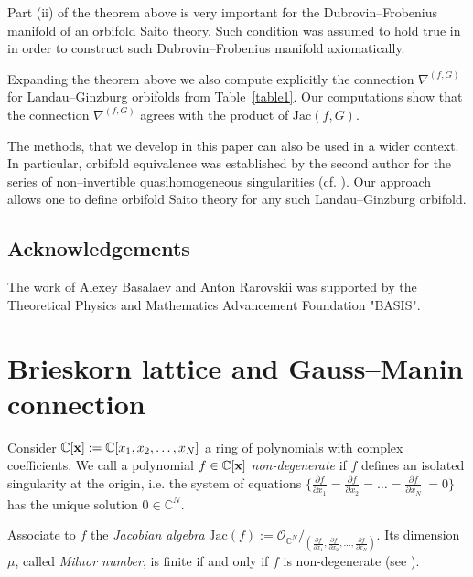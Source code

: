 \documentclass[reqno,12pt]{amsart}
\numberwithin{equation}{section}
\theoremstyle{plain}
\theoremstyle{definition}
\newcommand{\CC}{{\mathbb{C}}}
\newcommand{\Jac}{\mathrm{Jac}}
\newcommand{\bx}{{\bf x}}
\def\O{{\mathcal O}}
\numberwithin{equation}{section}
\begin{document}
Part (ii) of the theorem above is very important for the Dubrovin--Frobenius manifold of an orbifold Saito theory. Such condition was assumed to hold true in \cite{BT2} in order to construct such Dubrovin--Frobenius manifold axiomatically.

Expanding the theorem above we also compute explicitly the connection $\nabla^{(f,G)}$ for Landau--Ginzburg orbifolds from Table~\ref{table1}.
Our computations show that the connection $\nabla^{(f,G)}$ agrees with the product of $\Jac(f,G)$.

The methods, that we develop in this paper can also be used in a wider context. In particular, orbifold equivalence was established by the second author for the series of non--invertible quasihomogeneous singularities (cf. \cite{R1}). Our approach allows one to define orbifold Saito theory for any such Landau--Ginzburg orbifold.

\subsection*{Acknowledgements} 
The work of Alexey Basalaev and Anton Rarovskii was supported by the Theoretical Physics and Mathematics Advancement Foundation "BASIS".


\section{Brieskorn lattice and Gauss--Manin connection}

Consider $\CC[\bx] := \mathbb{C}[x_1,x_2, \dots, x_N]$ a ring of polynomials with complex coefficients. We call a polynomial $f\in \CC[\bx]$ \emph{non-degenerate} if $f$ defines an isolated singularity at the origin, i.e. the system of equations $\{\frac{\partial f}{\partial x_1} = \frac{\partial f}{\partial x_2} = \dots = \frac{\partial f}{\partial x_N}\ = 0\}$ has the unique solution $0 \in \CC^N$. 

Associate to $f$ the \emph{Jacobian algebra} $\Jac(f) := \O_{\CC^N}/_{(\frac{\partial f}{\partial x_1}, \frac{\partial f}{\partial x_2}, \dots, \frac{\partial f}{\partial x_N})}$.
Its dimension $\mu$, called \emph{Milnor number}, is finite if and only if $f$ is non-degenerate (see \cite{AGV}).
\end{document}
